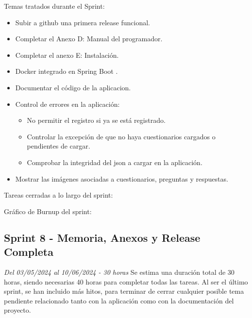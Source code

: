 Temas tratados durante el Sprint:
\begin{itemize}
	\item Subir a github una primera release funcional.
	\item Completar el Anexo D: Manual del programador.
	\item Completar el anexo E: Instalación.
	\item Docker integrado en Spring Boot \cite{web:SpringDocker}.
	\item Documentar el código de la aplicacion.
	\item Control de errores en la aplicación:
	\begin{itemize}
		\item No permitir el registro si ya se está registrado.
		\item Controlar la excepción de que no haya cuestionarios cargados o pendientes de cargar.
		\item Comprobar la integridad del json a cargar en la aplicación.
	\end{itemize}
	\item Mostrar las imágenes asociadas a cuestionarios, preguntas y respuestas.
\end{itemize}
\clearpage
Tareas cerradas a lo largo del sprint:

Gráfico de Burnup del sprint:

\clearpage
\subsection{Sprint 8 - Memoria, Anexos y Release Completa}
\textit{Del 03/05/2024 al 10/06/2024 - 30 horas}
Se estima una duración total de 30 horas, siendo necesarias 40 horas para completar todas las tareas.
Al ser el último sprint, se han incluido más hitos, para terminar de cerrar cualquier posible tema pendiente relacionado tanto con la aplicación como con la documentación del proyecto.

